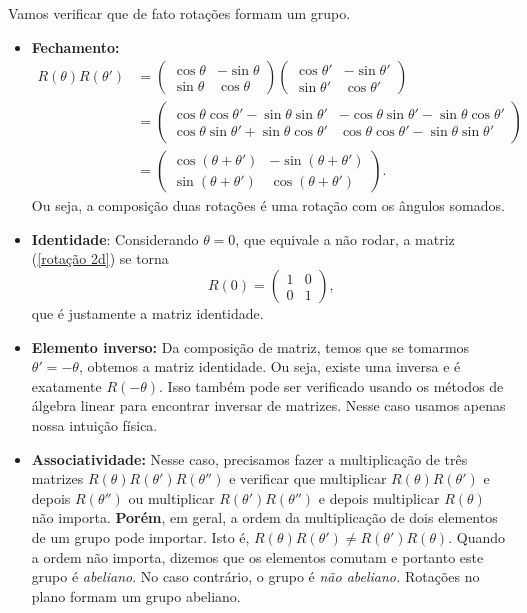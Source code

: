 \documentclass{article}
\numberwithin{equation}{section}
\numberwithin{figure}{section}
\begin{document}
Vamos verificar que de fato rotações formam um grupo. 
\begin{itemize}
	\item \textbf{Fechamento:} \begin{equation*}
		\begin{split}
	R(\theta)R(\theta')&= \begin{pmatrix}
		\cos\theta & -\sin\theta \\
		\sin\theta & \cos\theta 
	\end{pmatrix}\begin{pmatrix}
	\cos\theta' & -\sin\theta' \\
	\sin\theta' & \cos\theta' 
	\end{pmatrix}\\&=\begin{pmatrix}
	\cos\theta\cos\theta'-\sin\theta\sin\theta' & -\cos\theta\sin\theta'-\sin\theta\cos\theta' \\
	\cos\theta\sin\theta'+\sin\theta\cos\theta' & \cos\theta\cos\theta'-\sin\theta\sin\theta'
	\end{pmatrix}\\&=\begin{pmatrix}
	\cos(\theta+\theta') & -\sin(\theta+\theta') \\
	\sin(\theta+\theta') & \cos(\theta+\theta')
	\end{pmatrix}.
	\end{split}
\end{equation*}
Ou seja, a composição duas rotações é uma rotação com os ângulos somados.
\item \textbf{Identidade}: Considerando $\theta=0$, que equivale a não rodar, a matriz (\ref{rotação 2d}) se torna 
\begin{equation*}
	R(0)=\begin{pmatrix}
		1 & 0 \\
		0 & 1
	\end{pmatrix},
\end{equation*}
que é justamente a matriz identidade. 
\item \textbf{Elemento inverso:} Da composição de matriz, temos que se tomarmos $\theta'=-\theta$, obtemos a matriz identidade. Ou seja, existe uma inversa e é exatamente $R(-\theta)$. Isso também pode ser verificado usando os métodos de álgebra linear para encontrar inversar de matrizes. Nesse caso usamos apenas nossa intuição física. 
\item \textbf{Associatividade:} Nesse caso, precisamos fazer a multiplicação de três matrizes $R(\theta)R(\theta')R(\theta'')$ e verificar que multiplicar $R(\theta)R(\theta')$ e depois $R(\theta'')$ ou multiplicar $R(\theta')R(\theta'')$ e depois multiplicar $R(\theta)$ não importa. \textbf{Porém}, em geral, a ordem da multiplicação de dois elementos de um grupo pode importar. Isto é, $R(\theta)R(\theta')\neq R(\theta')R(\theta)$. Quando a ordem não importa, dizemos que os elementos comutam e portanto este grupo é \textit{abeliano}. No caso contrário, o grupo é \textit{não abeliano.} Rotações no plano formam um grupo abeliano. 
\end{itemize}
\end{document}
